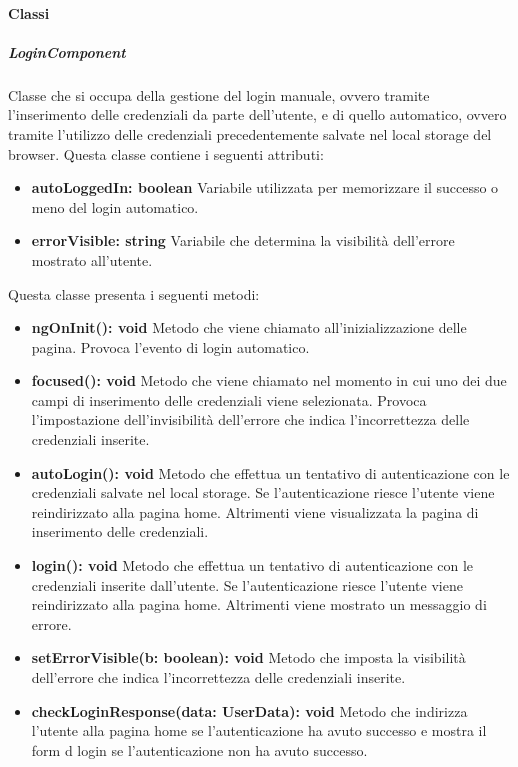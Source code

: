 \paragraph{Classi}

\subparagraph{LoginComponent}
Classe che si occupa della gestione del login manuale, ovvero tramite l'inserimento delle credenziali da parte dell'utente, e di quello automatico, ovvero tramite l'utilizzo delle credenziali precedentemente salvate nel local storage del browser. \newline
Questa classe contiene i seguenti attributi:
\begin{itemize}
	\item \textbf{autoLoggedIn: boolean} \newline
	Variabile utilizzata per memorizzare il successo o meno del login automatico.
	\item \textbf{errorVisible: string} \newline
	Variabile che determina la visibilità dell'errore mostrato all'utente.
\end{itemize}
Questa classe presenta i seguenti metodi:
\begin{itemize}
	\item \textbf{ngOnInit(): void} \newline
	Metodo che viene chiamato all'inizializzazione delle pagina. Provoca l'evento di login automatico.
	\item \textbf{focused(): void} \newline
	Metodo che viene chiamato nel momento in cui uno dei due campi di inserimento delle credenziali viene selezionata. Provoca l'impostazione dell'invisibilità dell'errore che indica l'incorrettezza delle credenziali inserite.
	\item \textbf{autoLogin(): void} \newline
	Metodo che effettua un tentativo di autenticazione con le credenziali salvate nel local storage. Se l'autenticazione riesce l'utente viene reindirizzato alla pagina home. Altrimenti viene visualizzata la pagina di inserimento delle credenziali.
	\item \textbf{login(): void} \newline
	Metodo che effettua un tentativo di autenticazione con le credenziali inserite dall'utente. Se l'autenticazione riesce l'utente viene reindirizzato alla pagina home. Altrimenti viene mostrato un messaggio di errore.
	\item \textbf{setErrorVisible(b: boolean): void} \newline
	Metodo che imposta la visibilità dell'errore che indica l'incorrettezza delle credenziali inserite.
	\item \textbf{checkLoginResponse(data: UserData): void} \newline
	Metodo che indirizza l'utente alla pagina home se l'autenticazione ha avuto successo e mostra il form d login se l'autenticazione non ha avuto successo.
\end{itemize}
